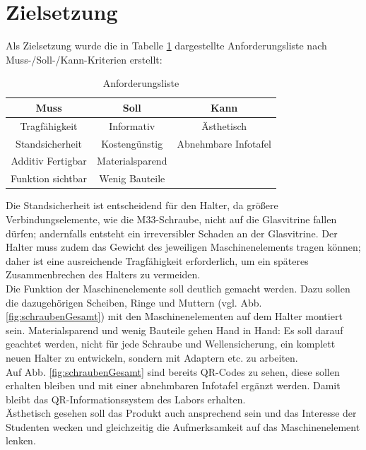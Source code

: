 \section{Zielsetzung}
Als Zielsetzung wurde die in Tabelle \ref{tab:zielsetzung} dargestellte Anforderungsliste nach Muss-/Soll-/Kann-Kriterien erstellt:\\

\begin{table}[H]
	\centering
	\caption{Anforderungsliste}
	\label{tab:zielsetzung}
	\begin{tabular}{c|c|c}		
		\textbf{Muss} & \textbf{Soll} & \textbf{Kann} \\
		\hline
		Tragfähigkeit & Informativ & Ästhetisch \\
		\hline
		Standsicherheit & Kostengünstig & Abnehmbare Infotafel \\
		\hline
		Additiv Fertigbar & Materialsparend & \\
		\hline
		Funktion sichtbar & Wenig Bauteile & \\
	\end{tabular}
\end{table}

Die Standsicherheit ist entscheidend für den Halter, da größere Verbindungselemente, wie die M33-Schraube, nicht auf die Glasvitrine fallen dürfen; andernfalls entsteht ein irreversibler Schaden an der Glasvitrine. Der Halter muss zudem das Gewicht des jeweiligen Maschinenelements tragen können; daher ist eine ausreichende Tragfähigkeit erforderlich, um ein späteres Zusammenbrechen des Halters zu vermeiden.\\

Die Funktion der Maschinenelemente soll deutlich gemacht werden. Dazu sollen die dazugehörigen Scheiben, Ringe und Muttern (vgl. Abb. \ref{fig:schraubenGesamt}) mit den Maschinenelementen auf dem Halter montiert sein. Materialsparend und wenig Bauteile gehen Hand in Hand: Es soll darauf geachtet werden, nicht für jede Schraube und Wellensicherung, ein komplett neuen Halter zu entwickeln, sondern mit Adaptern etc. zu arbeiten.\\

Auf Abb. \ref{fig:schraubenGesamt} sind bereits QR-Codes zu sehen, diese sollen erhalten bleiben und mit einer abnehmbaren Infotafel ergänzt werden. Damit bleibt das QR-Informationssystem des Labors erhalten.\\

Ästhetisch gesehen soll das Produkt auch ansprechend sein und das Interesse der Studenten wecken und gleichzeitig die Aufmerksamkeit auf das Maschinenelement lenken.
